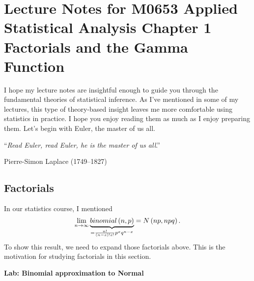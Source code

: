 \documentclass[12pt,oneside,english,american,flalign]{book}\usepackage[]{graphicx}\usepackage[]{color}
\date{}
\begin{document}
\begin{doublespace}

\end{doublespace}
\begin{doublespace}

\end{doublespace}

\setcounter{chapter}{1}

\chapter*{{\Huge{}Lecture Notes for M0653}{\LARGE{}}\protect \linebreak{}
{\Huge{}Applied Statistical Analysis}{\LARGE{}}\protect \linebreak{}
{\LARGE{}Chapter 1 Factorials and the Gamma Function}}

\noindent I hope my lecture notes are insightful enough to guide you
through the fundamental theories of statistical inference. As I\textquoteright ve
mentioned in some of my lectures, this type of theory-based insight
leaves me more comfortable using statistics in practice. I hope you
enjoy reading them as much as I enjoy preparing them. Let's begin
with Euler, the master of us all.
\noindent \begin{center}
``\textit{Read Euler, read Euler, he is the master of us all}.''
\par\end{center}

\noindent \begin{flushright}
Pierre-Simon Laplace (1749--1827)
\par\end{flushright}

\section{Factorials}

\noindent In our statistics course, I mentioned 
\[
\underset{n\rightarrow\infty}{\textrm{lim}}\thinspace\underset{=\frac{n!}{\left(n-x\right)!x!}p^{x}q^{n-x}}{\underbrace{binomial\left(n,p\right)}}=N\left(np,npq\right).
\]
To show this result, we need to expand those factorials above. This
is the motivation for studying factorials in this section.

\begin{doublespace}
\noindent \textbf{Lab: Binomial approximation to Normal}
\end{doublespace}
\end{document}
